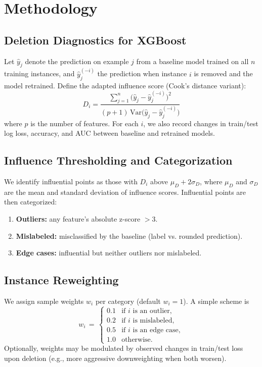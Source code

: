 \documentclass[sn-basic]{sn-jnl} %
\begin{document}
\section{Methodology}
\subsection{Deletion Diagnostics for XGBoost}
Let $\hat{y}_j$ denote the prediction on example $j$ from a baseline model trained on all $n$ training instances, and $\hat{y}_j^{(-i)}$ the prediction when instance $i$ is removed and the model retrained. Define the adapted influence score (Cook’s distance variant):
\begin{equation}
D_i = \frac{\sum_{j=1}^{n} \big(\hat{y}_j - \hat{y}_j^{(-i)}\big)^2}{(p+1)\,\text{Var}\big(\hat{y}_j - \hat{y}_j^{(-i)}\big)}
\label{eq:cooks}
\end{equation}
where $p$ is the number of features. For each $i$, we also record changes in train/test log loss, accuracy, and AUC between baseline and retrained models.

\subsection{Influence Thresholding and Categorization}
We identify influential points as those with $D_i$ above $\mu_D + 2\sigma_D$, where $\mu_D$ and $\sigma_D$ are the mean and standard deviation of influence scores. Influential points are then categorized:
\begin{enumerate}[leftmargin=*]
  \item \textbf{Outliers:} any feature’s absolute z-score $>3$.
  \item \textbf{Mislabeled:} misclassified by the baseline (label vs. rounded prediction).
  \item \textbf{Edge cases:} influential but neither outliers nor mislabeled.
\end{enumerate}

\subsection{Instance Reweighting}
We assign sample weights $w_i$ per category (default $w_i=1$). A simple scheme is
\begin{equation}
 w_i \,=\, \begin{cases}
 0.1 & \text{if } i \text{ is an outlier},\\
 0.2 & \text{if } i \text{ is mislabeled},\\
 0.5 & \text{if } i \text{ is an edge case},\\
 1.0 & \text{otherwise.}
 \end{cases}
\end{equation}
Optionally, weights may be modulated by observed changes in train/test loss upon deletion (e.g., more aggressive downweighting when both worsen).
\end{document}
